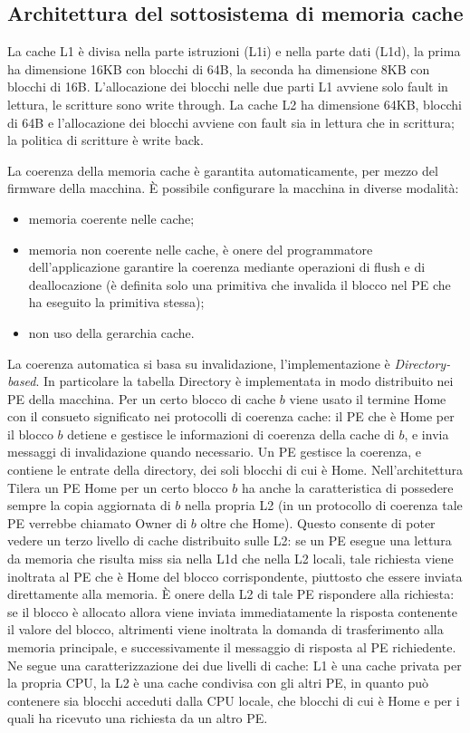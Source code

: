 \subsection{Architettura del sottosistema di memoria cache}
\label{sct:intro_arch_cache}
La cache L1 \`e divisa nella parte istruzioni (L1i) e nella parte dati (L1d), la prima ha dimensione 16KB con blocchi di 64B, la seconda ha dimensione 8KB con blocchi di 16B. L'allocazione dei blocchi nelle due parti L1 avviene solo fault in lettura, le scritture sono write through. La cache L2 ha dimensione 64KB, blocchi di 64B e l'allocazione dei blocchi avviene con fault sia in lettura che in scrittura; la politica di scritture \`e write back.

La coerenza della memoria cache \`e garantita automaticamente, per mezzo del firmware della macchina. \`E possibile configurare la macchina in diverse modalit\`a:
\begin{itemize}
\item memoria coerente nelle cache;
\item memoria non coerente nelle cache, \`e onere del programmatore dell'applicazione garantire la coerenza mediante operazioni di flush e di deallocazione (\`e definita solo una primitiva che invalida il blocco nel PE che ha eseguito la primitiva stessa);
\item non uso della gerarchia cache.
\end{itemize}
La coerenza automatica si basa su invalidazione, l'implementazione \`e \emph{Directory-based}. In particolare la tabella Directory \`e implementata in modo distribuito nei PE della macchina.
Per un certo blocco di cache $b$ viene usato il termine Home con il consueto significato nei protocolli di coerenza cache: il PE che \`e Home per il blocco $b$ detiene e gestisce le informazioni di coerenza della cache di $b$, e invia messaggi di invalidazione quando necessario. Un PE gestisce la coerenza, e contiene le entrate della directory, dei soli blocchi di cui \`e Home. 
Nell'architettura Tilera un PE Home per un certo blocco $b$ ha anche la caratteristica di possedere sempre la copia aggiornata di $b$ nella propria L2 (in un protocollo di coerenza tale PE verrebbe chiamato Owner di $b$ oltre che Home). Questo consente di poter vedere un terzo livello di cache distribuito sulle L2: se un PE esegue una lettura da memoria che risulta miss sia nella L1d che nella L2 locali, tale richiesta viene inoltrata al PE che \`e Home del blocco corrispondente, piuttosto che essere inviata direttamente alla memoria. \`E onere della L2 di tale PE rispondere alla richiesta: se il blocco \`e allocato allora viene inviata immediatamente la risposta contenente il valore del blocco, altrimenti viene inoltrata la domanda di trasferimento alla memoria principale, e successivamente il messaggio di risposta al PE richiedente. Ne segue una caratterizzazione dei due livelli di cache: L1 \`e una cache privata per la propria CPU, la L2 \`e una cache condivisa con gli altri PE, in quanto pu\`o contenere sia blocchi acceduti dalla CPU locale, che blocchi di cui \`e Home e per i quali ha ricevuto una richiesta da un altro PE.
 
